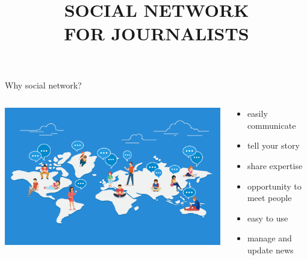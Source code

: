 \documentclass{beamer}
\begin{document}
\title{\huge \textbf{SOCIAL NETWORK\\ FOR JOURNALISTS}}

\begin{frame}
	\centering \maketitle	
\end{frame}

\begin{frame}{Why social network?}
\begin{columns}
	\begin{column}{0.5 \textwidth}
		\centering \includegraphics[scale=0.3]{01.png}
	\end{column}
	\begin{column}{0.5 \textwidth}
	\begin{itemize}
		\item easily communicate
		\item tell your story 
		\item share expertise
		\item opportunity to meet people
		\item easy to use 
		\item manage and update news 
	\end{itemize}
	\end{column}
\end{columns}

\end{frame}
\end{document}
